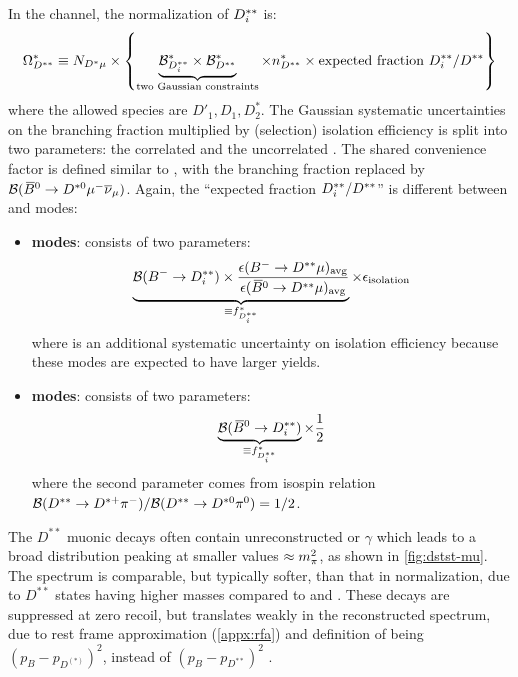 In the \Dstar channel, the normalization of $D^{**}_i$ is:
\begin{equation}
    \Omega_{D^{**}}^* \equiv N_{{{D}^*}\mu} \times \left\{
        \underbrace{\mathcal{B}_{D^{**}_i}^{*} \times \mathcal{B}_{D^{**}}^{*}}_\text{two Gaussian constraints}
        \times n_{D^{**}}^{*} \times
        \text{expected fraction $D^{**}_i/D^{**}$}
    \right\}
    \label{eqn:dstst-yield-dst}
\end{equation}
where the allowed species are $D'_1, D_1, D_2^*$.
The Gaussian systematic uncertainties on the branching fraction multiplied by
(selection) isolation efficiency is split into two parameters:
the correlated \fitBFDstpi and the uncorrelated \fitBFDi.
The shared convenience factor \fitNDststz is defined similar to \fitNDststDz,
with the branching fraction replaced by
$\mathcal{B}({{\kern 0.18em\overline{\kern -0.18em B}}{}^0} \rightarrow {\ensuremath{{D}^{*0}}} {\ensuremath{\mu^-}}{\ensuremath{{\overline{\nu}}_\mu}})$.
Again, the ``expected fraction $D^{**}_i/D^{**}$'' is different between \Bm
and \Bzb modes:
\begin{itemize}
    \item \textbf{\Bm modes}:
        consists of two parameters:
        \begin{equation}
            \underbrace{
                \mathcal{B}({{{B}^-}} \rightarrow D^{**}_i) \times
                \frac{\epsilon({{{B}^-}} \rightarrow D^{**}\mu)_\text{avg}}{
                    \epsilon({{\kern 0.18em\overline{\kern -0.18em B}}{}^0} \rightarrow D^{**}\mu)_\text{avg}
                }
            }_{\equiv f_{D^{**}_i}^{*}}
            \times \epsilon_\text{isolation}
        \end{equation}
        where \fitisolationsys is an additional systematic uncertainty on
        isolation efficiency because these modes are expected to have larger
        yields.

    \item \textbf{\Bzb modes}:
        consists of two parameters:
        \begin{equation}
            \underbrace{\mathcal{B}({{\kern 0.18em\overline{\kern -0.18em B}}{}^0} \rightarrow D^{**}_i)}_{\equiv f_{D^{**}_i}^{*}}
            \times \frac{1}{2}
        \end{equation}
        where the second parameter comes from isospin relation
        $\mathcal{B}(D^{**} \rightarrow {\ensuremath{{D}^{*+}}}{\ensuremath{{\pi}^-}}) /
        \mathcal{B}(D^{**} \rightarrow {\ensuremath{{D}^{*0}}}{\ensuremath{{\pi}^0}}) = 1/2$.
\end{itemize}

The $D^{**}$ muonic decays often contain unreconstructed \piz or $\gamma$ which
leads to a broad \mmSq distribution peaking at smaller values
$\approx m^2_{\pi}$,
as shown in \cref{fig:dstst-mu}.
The \el spectrum is comparable, but typically softer, than that in normalization,
due to $D^{**}$ states having higher masses compared to \Dz and \Dstar.
These decays are suppressed at zero recoil,
but translates weakly in the reconstructed \qSq spectrum,
due to rest frame approximation (\cref{appx:rfa}) and definition of \qSq being
$(p_B - p_{D^{(*)}})^2$, instead of $(p_B - p_{D^{**}})^2$
\cite{LHCb-ANA-2020-056}.

